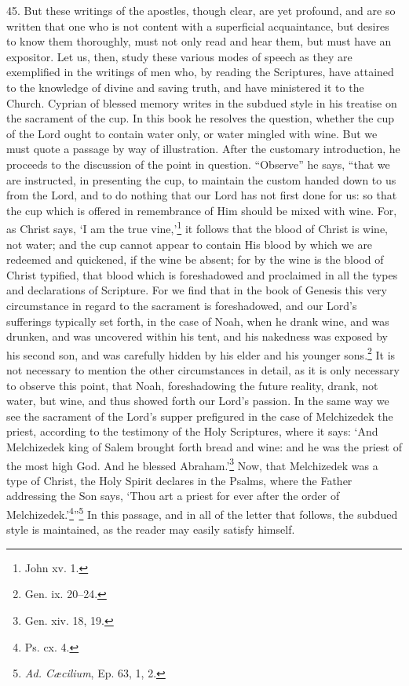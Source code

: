 45. But these writings of the apostles, though clear, are yet profound, and are so written that one who is not content with a superficial acquaintance, but desires to know them thoroughly, must not only read and hear them, but must have an expositor. Let us, then, study these various modes of speech as they are exemplified in the writings of men who, by reading the Scriptures, have attained to the knowledge of divine and saving truth, and have ministered it to the Church. Cyprian of blessed memory writes in the subdued style in his treatise on the sacrament of the cup. In this book he resolves the question, whether the cup of the Lord ought to contain water only, or water mingled with wine. But we must quote a passage by way of illustration. After the customary introduction, he proceeds to the discussion of the point in question. “Observe” he says, “that we are instructed, in presenting the cup, to maintain the custom handed down to us from the Lord, and to do nothing that our Lord has not first done for us: so that the cup which is offered in remembrance of Him should be mixed with wine. For, as Christ says, ‘I am the true vine,’\footnote{John xv. 1.} it follows that the blood of Christ is wine, not water; and the cup cannot appear to contain His blood by which we are redeemed and quickened, if the wine be absent; for by the wine is the blood of Christ typified, that blood which is foreshadowed and proclaimed in all the types and declarations of Scripture. For we find that in the book of Genesis this very circumstance in regard to the sacrament is foreshadowed, and our Lord’s sufferings typically set forth, in the case of Noah, when he drank wine, and was drunken, and was uncovered within his tent, and his nakedness was exposed by his second son, and was carefully hidden by his elder and his younger sons.\footnote{Gen. ix. 20–24.} It is not necessary to mention the other circumstances in detail, as it is only necessary to observe this point, that Noah, foreshadowing the future reality, drank, not water, but wine, and thus showed forth our Lord’s passion. In the same way we see the sacrament of the Lord’s supper prefigured in the case of Melchizedek the priest, according to the testimony of the Holy Scriptures, where it says: ‘And Melchizedek king of Salem brought forth bread and wine: and he was the priest of the most high God. And he blessed Abraham.’\footnote{Gen. xiv. 18, 19.} Now, that Melchizedek was a type of Christ, the Holy Spirit declares in the Psalms, where the Father addressing the Son says, ‘Thou art a priest for ever after the order of Melchizedek.’\footnote{Ps. cx. 4.}”\footnote{\emph{Ad. Cæcilium}, Ep. 63, 1, 2.} In this passage, and in all of the letter that follows, the subdued style is maintained, as the reader may easily satisfy himself.

